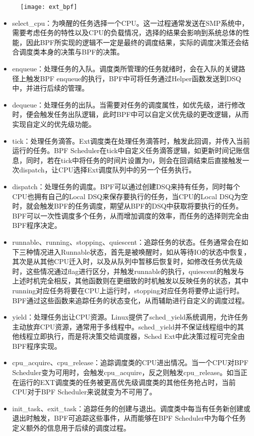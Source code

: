 \begin{figure}[!htbp]
    \centering
    \texttt{[image: ext\_bpf]}
    \label{fig:ext_bpf}
\end{figure}

\begin{itemize}
    \item select\_cpu：为唤醒的任务选择一个CPU。这一过程通常发送在SMP系统中，需要考虑任务的特性以及CPU的负载情况，选择的结果会影响到系统总体的性能，因此BPF所实现的逻辑不一定是最终的调度结果，实际的调度决策还会结合调度类本身的决策与BPF的决策。
    \item enqueue：处理任务的入队。调度类所管理的任务就绪时，会在入队的关键路径上触发BPF enqueue的执行，BPF中可将任务通过Helper函数发送到DSQ中，并进行后续的管理。
    \item dequeue：处理任务的出队。当需要对任务的调度属性，如优先级，进行修改时，便会触发任务出队逻辑，此时BPF中可以自定义优先级的更改逻辑，从而实现自定义的优先级功能。
    \item tick：处理任务滴答。Ext调度类在处理任务滴答时，触发此回调，并传入当前运行的任务。BPF Scheduler在tick中自定义任务滴答逻辑，如更新时间记账信息，同时，若在tick中将任务的时间片设置为0，则会在回调结束后直接触发一次dispatch，让CPU选择Ext调度队列中的另一个任务执行。
    \item dispatch：处理任务的调度。BPF可以通过创建DSQ来持有任务，同时每个CPU也拥有自己的Local DSQ来保存要执行的任务，当CPU的Local DSQ为空时，就会触发BPF的任务调度，期望从BPF的DSQ中获取将要执行的任务。BPF可以一次性调度多个任务，从而增加调度的效率，而任务的选择则完全由BPF程序决定。
    \item runnable、running、stopping、quiescent：追踪任务的状态。任务通常会在如下三种情况进入Runnable状态，首先是被唤醒时，如从等待IO的状态中恢复，其次是从其他CPU迁入时，以及从队列中暂移后恢复时，如修改任务优先级时，这些情况通过flag进行区分，并触发runnable的执行，quiescent的触发与上述时机完全相反，其他函数则在更细致的时机触发以反映任务的状态，其中running对应任务将要在CPU上运行时，stopping对应任务将要停止运行时。BPF通过这些函数来追踪任务的状态变化，从而辅助进行自定义的调度过程。
    \item yield：处理任务出让CPU资源。Linux提供了sched\_yield系统调用，允许任务主动放弃CPU资源，通常用于多线程中。sched\_yield并不保证线程组中的其他线程立即执行，而是将决策交给调度器，Sched Ext中此决策过程可完全由BPF程序实现。
    \item cpu\_acquire、cpu\_release：追踪调度类的CPU进出情况。当一个CPU对BPF Scheduler变为可用时，会触发cpu\_acquire，反之则触发cpu\_release。如当正在运行的EXT调度类的任务被更高优先级调度类的其他任务抢占时，当前CPU对于BPF Scheduler来说就变为不可用了。
    \item init\_task、exit\_task：追踪任务的创建与退出。调度类中每当有任务新创建或退出时触发，BPF可追踪这些事件，从而能够在BPF Scheduler中为每个任务定义额外的信息用于后续的调度过程。
\end{itemize}

